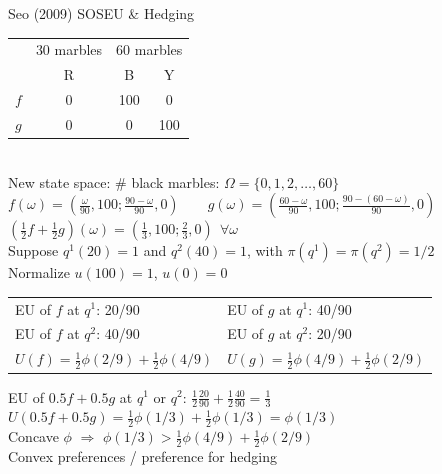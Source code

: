 \begin{frame}{Seo (2009) SOSEU \& Hedging}
\hspace{1in}\begin{tabular}{cc|cc}
      & 30 marbles & \multicolumn{2}{c}{60 marbles}  \\
      & R & B & Y \\
      \hline
      $f$ & 0 & 100 & 0 \\
      $g$ & 0 & 0 & 100\\
      \hline
\end{tabular}\\
New state space: \# black marbles: $\Omega=\{0,1,2,\ldots,60\}$\\
$f(\omega)= (\frac{\omega}{90},100;\frac{90-\omega}{90},0)$\ \ \ \ 
$g(\omega)= (\frac{60-\omega}{90},100;\frac{90-(60-\omega)}{90},0)$\\
\hspace{0.75in} $(\frac{1}{2}f+\frac{1}{2}g)(\omega) = (\frac{1}{3},100;\frac{2}{3},0)\ \ \forall \omega$\\
Suppose $q^1(20)=1$ and $q^2(40)=1$, with $\pi(q^1)=\pi(q^2)=1/2$\\
Normalize $u(100)=1$, $u(0)=0$\\
\begin{tabular}{ll}
EU of $f$ at $q^1$: 20/90 & EU of $g$ at $q^1$: 40/90\\
EU of $f$ at $q^2$: 40/90 & EU of $g$ at $q^2$: 20/90\\
$U(f)=\frac{1}{2}\phi(2/9)+\frac{1}{2}\phi(4/9)$ & $U(g)=\frac{1}{2}\phi(4/9)+\frac{1}{2}\phi(2/9)$
\end{tabular}
\begin{center}
EU of $0.5f+0.5g$ at $q^1$ or $q^2$: $\frac{1}{2}\frac{20}{90}+\frac{1}{2}\frac{40}{90}=\frac{1}{3}$\\
$U(0.5f+0.5g) = \frac{1}{2}\phi(1/3)+\frac{1}{2}\phi(1/3)=\phi(1/3)$\\
Concave $\phi$ $\Rightarrow$ $\phi(1/3)>\frac{1}{2}\phi(4/9)+\frac{1}{2}\phi(2/9)$\\
Convex preferences / preference for hedging
\end{center}
\end{frame}

